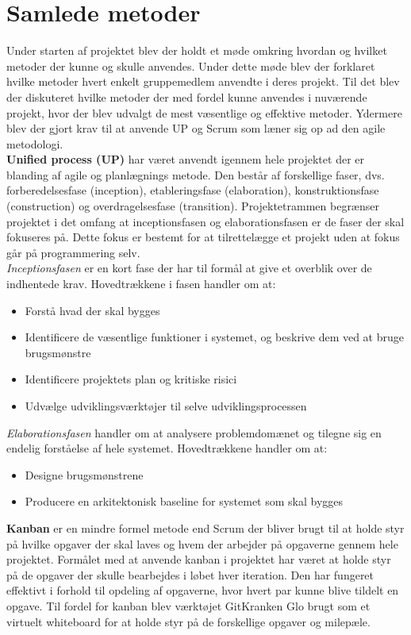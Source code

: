 \section{Samlede metoder}
Under starten af projektet blev der holdt et møde omkring hvordan og hvilket metoder der kunne og skulle anvendes. Under dette møde blev der forklaret hvilke metoder hvert enkelt gruppemedlem anvendte i deres projekt. Til det blev der diskuteret hvilke metoder der med fordel kunne anvendes i nuværende projekt, hvor der blev udvalgt de mest væsentlige og effektive metoder. Ydermere blev der gjort krav til at anvende UP og Scrum som læner sig op ad den agile metodologi.  \\
\textbf{ Unified process (UP)} har været anvendt igennem hele projektet der er blanding af agile og planlægnings metode. Den består af forskellige faser, dvs. forberedelsesfase (inception), etableringsfase (elaboration), konstruktionsfase (construction) og overdragelsesfase (transition). Projektetrammen begrænser projektet i det omfang at inceptionsfasen og elaborationsfasen er de faser der skal fokuseres på. Dette fokus er bestemt for at tilrettelægge et projekt uden at fokus går på programmering selv. \\ 
\emph{Inceptionsfasen} er en kort fase der har til formål at give et overblik over de indhentede krav. Hovedtrækkene i fasen handler om at:\\
\begin{itemize}
\item Forstå hvad der skal bygges
\item Identificere de væsentlige funktioner i systemet, og beskrive dem ved at bruge brugsmønstre
\item Identificere projektets plan og kritiske risici
\item Udvælge udviklingsværktøjer til selve udviklingsprocessen
\end{itemize}
\emph{Elaborationsfasen} handler om at analysere problemdomænet og tilegne sig en endelig forståelse af hele systemet. Hovedtrækkene handler om at: \\
\begin{itemize}
\item Designe brugsmønstrene
\item Producere en arkitektonisk baseline for systemet som skal bygges
\end{itemize}
\textbf{Kanban} er en mindre formel metode end Scrum der bliver brugt til at holde styr på hvilke opgaver der skal laves og hvem der arbejder på opgaverne gennem hele projektet. Formålet med at anvende kanban i projektet har været at holde styr på de opgaver der skulle bearbejdes i løbet hver iteration. Den har fungeret effektivt i forhold til opdeling af opgaverne, hvor hvert par kunne blive tildelt en opgave. Til fordel for kanban blev værktøjet GitKranken Glo brugt som et virtuelt whiteboard for at holde styr på de forskellige opgaver og milepæle. \\
